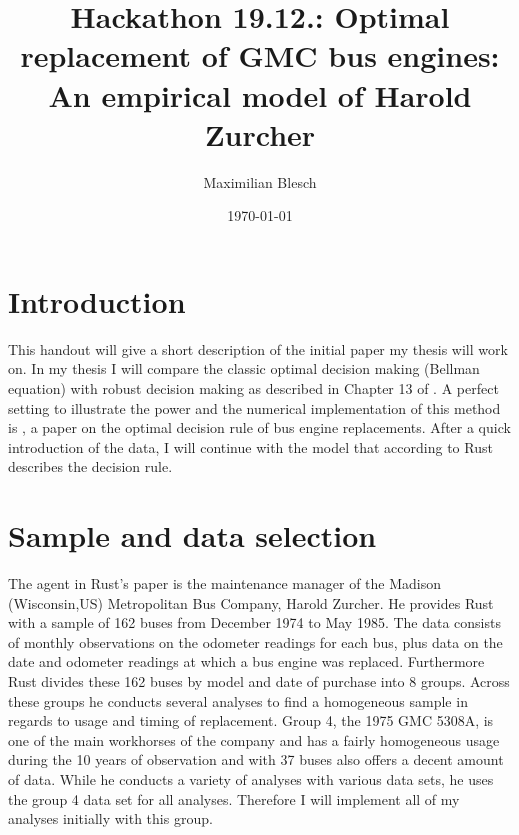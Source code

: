 \documentclass[a4paper,12pt,bold]{scrartcl}
\title{Hackathon 19.12.: Optimal replacement of GMC bus engines: An empirical
model of Harold Zurcher}
\author{Maximilian Blesch}
\date{\today}
\begin{document}
\maketitle

\section{Introduction}
This handout will give a short description of the initial paper my thesis will work on. In my thesis I will compare the classic optimal decision making (Bellman equation) with robust decision making as described in Chapter 13 of \cite{Ben-Tal.2009}. A perfect setting to illustrate the power and the numerical implementation of this method is \cite{Rust.1987}, a paper on the optimal decision rule of bus engine replacements. After a quick introduction of the data, I will continue with the model that according to Rust describes the decision rule.

\section{Sample and data selection}
The agent in Rust's paper is the maintenance manager of the Madison (Wisconsin,US) Metropolitan Bus Company, Harold Zurcher. He provides Rust with a sample of 162 buses from December 1974 to May 1985. The data consists of monthly observations on the odometer readings for each bus, plus data on the date and odometer readings at which a bus engine was replaced. Furthermore Rust divides these 162 buses by model and date of purchase into 8 groups. Across these groups he conducts several analyses to find a homogeneous sample in regards to usage and timing of replacement. Group 4, the 1975 GMC 5308A, is one of the main workhorses of the company and has a fairly homogeneous usage during the 10 years of observation and with 37 buses also offers a decent amount of data. While he conducts a variety of analyses with various data sets, he uses the group 4 data set for all analyses. Therefore I will implement all of my analyses initially with this group.
\end{document}
